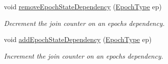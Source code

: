 \begin{DoxyCompactItemize}
void \hyperlink{structvt_1_1term_1_1_termination_detector_aac9b76ef4345ca2c757f829a17bb7bfb}{remove\+Epoch\+State\+Dependency} (\hyperlink{namespacevt_a985a5adf291c34a3ca263b3378388236}{Epoch\+Type} ep)
\begin{DoxyCompactList}\small\item\em Decrement the join counter on an epoch\textquotesingle{}s dependency. \end{DoxyCompactList}\item 
void \hyperlink{structvt_1_1term_1_1_termination_detector_ac0c59133b2db32f599aa4b5f8f451fe0}{add\+Epoch\+State\+Dependency} (\hyperlink{namespacevt_a985a5adf291c34a3ca263b3378388236}{Epoch\+Type} ep)
\begin{DoxyCompactList}\small\item\em Increment the join counter on an epoch\textquotesingle{}s dependency. \end{DoxyCompactList}\end{DoxyCompactItemize}
